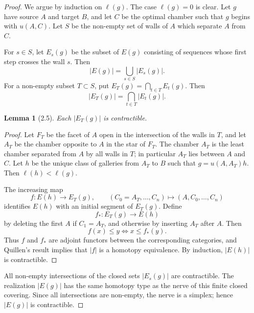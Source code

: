 \documentclass[11pt]{article}
\newtheorem{lemma}[theorem]{Lemma}
\begin{document}
\begin{proof}
We argue by induction on $\ell(g)$. The case $\ell(g)=0$ is clear. Let $g$ have source $A$ and target $B$, and let $C$ be the optimal chamber such that $g$ begins with $u(A,C)$. Let $S$ be the non-empty set of walls of $A$ which separate $A$ from $C$.

For $s\in S$, let $E_s(g)$ be the subset of $E(g)$ consisting of sequences whose first step crosses the wall $s$. Then
\begin{equation}
|E(g)|=\bigcup_{s\in S}|E_s(g)|.
\tag{2.4.1}
\end{equation}
For a non-empty subset $T\subset S$, put $E_T(g)=\bigcap_{t\in T}E_t(g)$. Then
\begin{equation}
|E_T(g)|=\bigcap_{t\in T}|E_t(g)|.
\tag{2.4.2}
\end{equation}

\begin{lemma}[2.5]
Each $|E_T(g)|$ is contractible.
\end{lemma}
\begin{proof}
Let $F_T$ be the facet of $A$ open in the intersection of the walls in $T$, and let $A_T$ be the chamber opposite to $A$ in the star of $F_T$. The chamber $A_T$ is the least chamber separated from $A$ by all walls in $T$; in particular $A_T$ lies between $A$ and $C$. Let $h$ be the unique class of galleries from $A_T$ to $B$ such that $g=u(A,A_T)h$. Then $\ell(h)<\ell(g)$.

The increasing map
\begin{equation}
f:E(h)\longrightarrow E_T(g),\qquad
(C_0=A_T,\ldots,C_n)\longmapsto(A,C_0,\ldots,C_n)
\tag{2.5.1}
\end{equation}
identifies $E(h)$ with an initial segment of $E_T(g)$. Define
\begin{equation}
f_*:E_T(g)\to E(h)
\tag{2.5.2}
\end{equation}
by deleting the first $A$ if $C_1=A_T$, and otherwise by inserting $A_T$ after $A$. Then
\begin{equation}
f(x)\le y \Longleftrightarrow x\le f_*(y).\tag{2.5.3}
\end{equation}
Thus $f$ and $f_*$ are adjoint functors between the corresponding categories, and Quillen's result implies that $|f|$ is a homotopy equivalence. By induction, $|E(h)|$ is contractible.
\end{proof}

All non-empty intersections of the closed sets $|E_s(g)|$ are contractible. The realization $|E(g)|$ has the same homotopy type as the nerve of this finite closed covering. Since all intersections are non-empty, the nerve is a simplex; hence $|E(g)|$ is contractible.
\end{proof}
\end{document}
